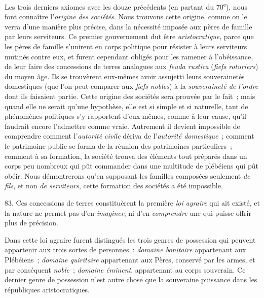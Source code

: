 \documentclass[french,twoside]{book} %
\begin{document}
Les trois derniers axiomes avec les douze précédents (en partant du 70\textsuperscript{e}), nous font connaître l’{\itshape origine des sociétés}. Nous trouvons cette origine, comme on le verra d’une manière plus précise, dans la nécessité imposée aux pères de famille par leurs serviteurs. Ce premier gouvernement dut être {\itshape aristocratique}, parce que les pères de famille s’unirent en corps politique pour résister à leurs serviteurs mutinés contre eux, et furent cependant obligés pour les ramener à l’obéissance, de leur faire des concessions de terres analogues aux {\itshape feuda rustica} ({\itshape fiefs roturiers}) du moyen âge. Ils se trouvèrent eux-mêmes avoir assujetti leurs souverainetés domestiques (que l’on peut comparer aux {\itshape fiefs nobles}) à la {\itshape souveraineté de l’ordre} dont ils faisaient partie. Cette origine des sociétés sera prouvée par le fait ;  mais quand elle ne serait qu’une hypothèse, elle est si simple et si naturelle, tant de phénomènes politiques s’y rapportent d’eux-mêmes, comme à leur cause, qu’il faudrait encore l’admettre comme vraie. Autrement il devient impossible de comprendre comment l’{\itshape autorité civile} dériva de l’{\itshape autorité domestique} ; comment le patrimoine public se forma de la réunion des patrimoines particuliers ; comment à sa formation, la société trouva des éléments tout préparés dans un corps peu nombreux qui pût commander dans une multitude de plébéiens qui pût obéir. Nous démontrerons qu’en supposant les familles composées seulement {\itshape de fils}, et non {\itshape de serviteurs}, cette formation des sociétés a été impossible.\par
83. Ces concessions de terres constituèrent la première {\itshape loi agraire} qui ait existé, et la nature ne permet pas d’en {\itshape imaginer}, ni d’en {\itshape comprendre} une qui puisse offrir plus de précision.\par
Dans cette loi agraire furent distingués les trois genres de possession qui peuvent appartenir aux trois sortes de personnes : {\itshape domaine bonitaire} appartenant aux Plébéiens ; {\itshape domaine quiritaire} appartenant aux Pères, conservé par les armes, et par conséquent {\itshape noble} ; {\itshape domaine éminent}, appartenant au corps souverain. Ce dernier genre de possession n’est autre chose que la souveraine puissance dans les républiques aristocratiques.
\end{document}
